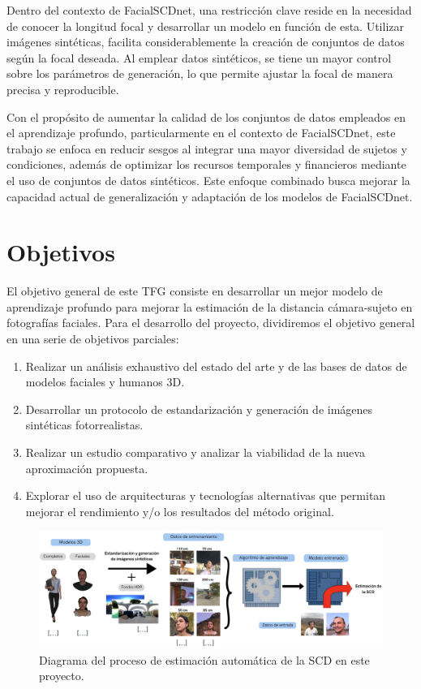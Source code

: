 Dentro del contexto de FacialSCDnet, una restricción clave reside en la necesidad de conocer la longitud focal y desarrollar un modelo en función de esta. Utilizar imágenes sintéticas, facilita considerablemente la creación de conjuntos de datos según la focal deseada.
Al emplear datos sintéticos, se tiene un mayor control sobre los parámetros de generación, lo que permite ajustar la focal de manera precisa y reproducible.

Con el propósito de aumentar la calidad de los conjuntos de datos empleados en el aprendizaje profundo, particularmente en el contexto de FacialSCDnet, este trabajo se enfoca en reducir sesgos al integrar una mayor diversidad de sujetos y condiciones, además de optimizar los recursos temporales y financieros mediante el uso de conjuntos de datos sintéticos. Este enfoque combinado busca mejorar la capacidad actual de generalización y adaptación de los modelos de FacialSCDnet.

\section{Objetivos}
 El objetivo general de este TFG consiste en desarrollar un mejor modelo de aprendizaje profundo para mejorar la estimación de la distancia cámara-sujeto en fotografías faciales. Para el desarrollo del proyecto, dividiremos el objetivo general en una serie de objetivos parciales:
\begin{enumerate}
    \item Realizar un análisis exhaustivo del estado del arte y de las bases de datos de modelos faciales y humanos 3D.
    \item Desarrollar un protocolo de estandarización y generación de imágenes sintéticas fotorrealistas.
    \item Realizar un estudio comparativo y analizar la viabilidad de la nueva aproximación propuesta.
    \item Explorar el uso de arquitecturas y tecnologías alternativas que permitan mejorar el rendimiento y/o los resultados del método original.
\end{enumerate}

\begin{figure}[h]
	\centering
	\includegraphics[scale=0.35]{imagenes/cap1/resumen.png}
	\caption{Diagrama del proceso de estimación automática de la SCD en este proyecto.}
	\label{fig5}
\end{figure}

